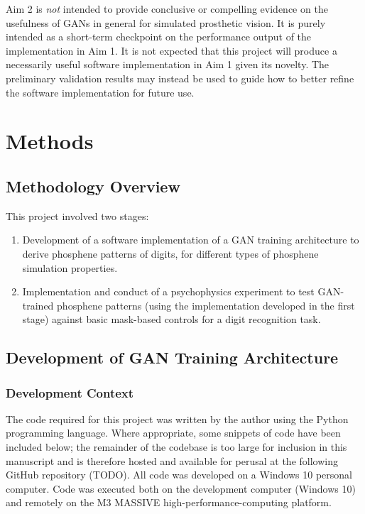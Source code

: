 \documentclass[11pt]{book}
\begin{document}
Aim 2 is \emph{not} intended to provide conclusive or compelling evidence on the usefulness of GANs in general for simulated prosthetic vision.
It is purely intended as a short-term checkpoint on the performance output of the implementation in Aim 1.
It is not expected that this project will produce a necessarily useful software implementation in Aim 1 given its novelty.
The preliminary validation results may instead be used to guide how to better refine the software implementation for future use.

\part{Methods}
\label{sec:org6b13db8}
\chapter{Methodology Overview}
\label{sec:org08f06b5}

This project involved two stages:

\begin{enumerate}
\item Development of a software implementation of a GAN training architecture to derive phosphene patterns of digits, for different types of phosphene simulation properties.
\item Implementation and conduct of a psychophysics experiment to test GAN-trained phosphene patterns (using the implementation developed in the first stage) against basic mask-based controls for a digit recognition task.
\end{enumerate}

\chapter{Development of GAN Training Architecture}
\label{sec:org82d09ce}
\section*{Development Context}
\label{sec:org60bfeb3}

The code required for this project was written by the author using the Python programming language.
Where appropriate, some snippets of code have been included below; the remainder of the codebase is too large for inclusion in this manuscript and is therefore hosted and available for perusal at the following GitHub repository (TODO).
All code was developed on a Windows 10 personal computer.
Code was executed both on the development computer (Windows 10) and remotely on the M3 MASSIVE high-performance-computing platform.
\end{document}
